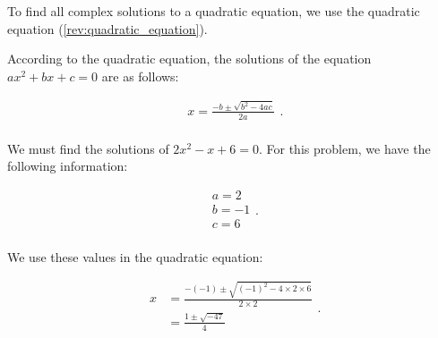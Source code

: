 
To find all complex solutions to a quadratic equation, we use the quadratic
equation (\ref{rev:quadratic_equation}).

According to the quadratic equation, the solutions of the equation $ax^{2} + bx
+ c = 0$ are as follows:

\begin{equation}
  \label{eqt:quadratic_equation_2}
  \begin{split}
    x = \frac{-b \pm \sqrt{b^{2} - 4ac}}{2a} \\
  \end{split}
.\end{equation}

\begin{example}
  \label{exm:find_solutions}

  We must find the solutions of $2x^{2} - x + 6 = 0$. For this problem, we have
  the following information:

  \begin{equation}
    \label{eqt:information}
    \begin{split}
      a = 2 \\
      b = -1 \\
      c = 6 \\
    \end{split}
  .\end{equation}

  We use these values in the quadratic equation:

  \begin{equation}
    \label{eqt:values_in_quadratic_equation}
    \begin{split}
      x &= \frac{-(-1) \pm \sqrt{(-1)^{2} - 4 \times 2 \times 6}}{2 \times 2} \\
      &= \frac{1 \pm \sqrt{-47}}{4} \\
    \end{split}
  .\end{equation}
\end{example}

